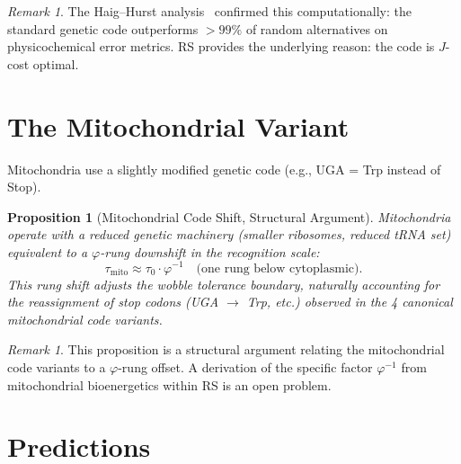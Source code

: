 \documentclass[12pt,a4paper]{article}
\newtheorem{proposition}[theorem]{Proposition}
\theoremstyle{definition}
\theoremstyle{remark}
\newtheorem{remark}[theorem]{Remark}
\begin{document}
\begin{remark}
The Haig--Hurst analysis~\cite{HaigHurst1991} confirmed this
computationally: the standard genetic code outperforms $> 99\%$ of
random alternatives on physicochemical error metrics.  RS provides
the underlying reason: the code is $J$-cost optimal.
\end{remark}

\section{The Mitochondrial Variant}
\label{sec:mitochondrial}

Mitochondria use a slightly modified genetic code (e.g., UGA = Trp
instead of Stop).

\begin{proposition}[Mitochondrial Code Shift, Structural Argument]
\label{prop:mito}
Mitochondria operate with a reduced genetic machinery (smaller ribosomes,
reduced tRNA set) equivalent to a $\varphi$-rung downshift in the
recognition scale:
\begin{equation}
  \tau_{\mathrm{mito}} \approx \tau_0 \cdot \varphi^{-1}
  \quad\text{(one rung below cytoplasmic)}.
\end{equation}
This rung shift adjusts the wobble tolerance boundary, naturally
accounting for the reassignment of stop codons (UGA $\to$ Trp, etc.)
observed in the 4 canonical mitochondrial code variants.
\end{proposition}

\begin{remark}
This proposition is a structural argument relating the mitochondrial
code variants to a $\varphi$-rung offset.  A derivation of the specific
factor $\varphi^{-1}$ from mitochondrial bioenergetics within RS is an
open problem.
\end{remark}

\section{Predictions}
\label{sec:predictions}
\end{document}
